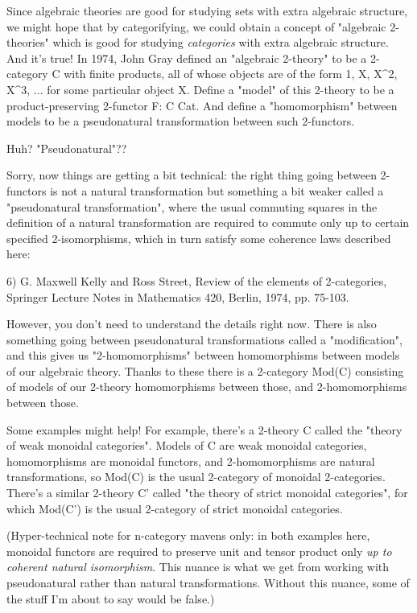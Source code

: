 Since algebraic theories are good for studying sets with extra
algebraic structure, we might hope that by categorifying, we could
obtain a concept of "algebraic 2-theories" which is good for studying
\emph{categories} with extra algebraic structure.  And it's true!
In 1974, John Gray defined an "algebraic 2-theory" to be a 2-category
C with finite products, all of whose objects are of the form 1, X,
X^{2}, X^{3}, ...  for some particular object X.
Define a "model" of this 2-theory to be a product-preserving 2-functor
F: C \to  Cat.  And define a "homomorphism" between models to be a
pseudonatural transformation between such 2-functors.

Huh?  "Pseudonatural"??  

Sorry, now things are getting a bit technical: the right thing going between 
2-functors is not a natural transformation but something a bit weaker called 
a "pseudonatural transformation", where the usual commuting squares in the 
definition of a natural transformation are required to commute only up to 
certain specified 2-isomorphisms, which in turn satisfy some coherence laws 
described here:

6) G. Maxwell Kelly and Ross Street, Review of the elements of 2-categories, 
Springer Lecture Notes in Mathematics 420, Berlin, 1974, pp. 75-103.

However, you don't need to understand the details right now.  There is also 
something going between pseudonatural transformations called a "modification",
and this gives us "2-homomorphisms" between homomorphisms between models of 
our algebraic theory.  Thanks to these there is a 2-category Mod(C) consisting 
of models of our 2-theory homomorphisms between those, and 2-homomorphisms 
between those.  

Some examples might help!  For example, there's a 2-theory C called the 
"theory of weak monoidal categories".  Models of C are weak monoidal 
categories, homomorphisms are monoidal functors, and 2-homomorphisms are 
natural transformations, so Mod(C) is the usual 2-category of monoidal 
2-categories.   There's a similar 2-theory C' called "the theory of strict 
monoidal categories", for which Mod(C') is the usual 2-category of strict 
monoidal categories.  

(Hyper-technical note for n-category mavens only: in both examples here, 
monoidal functors are required to preserve unit and tensor product only 
\emph{up to coherent natural isomorphism}.  This nuance is what we get from 
working with pseudonatural rather than natural transformations.  Without 
this nuance, some of the stuff I'm about to say would be false.)

